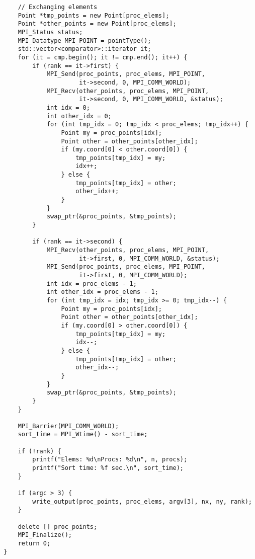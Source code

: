 \documentclass[oneside,final,14pt]{extreport}
\begin{document}
\begin{verbatim}
    // Exchanging elements
    Point *tmp_points = new Point[proc_elems];
    Point *other_points = new Point[proc_elems];
    MPI_Status status;
    MPI_Datatype MPI_POINT = pointType();
    std::vector<comparator>::iterator it;
    for (it = cmp.begin(); it != cmp.end(); it++) {
        if (rank == it->first) {
            MPI_Send(proc_points, proc_elems, MPI_POINT,
                     it->second, 0, MPI_COMM_WORLD);
            MPI_Recv(other_points, proc_elems, MPI_POINT,
                     it->second, 0, MPI_COMM_WORLD, &status);
            int idx = 0;
            int other_idx = 0;
            for (int tmp_idx = 0; tmp_idx < proc_elems; tmp_idx++) {
                Point my = proc_points[idx];
                Point other = other_points[other_idx];
                if (my.coord[0] < other.coord[0]) {
                    tmp_points[tmp_idx] = my;
                    idx++;
                } else {
                    tmp_points[tmp_idx] = other;
                    other_idx++;
                }
            }
            swap_ptr(&proc_points, &tmp_points);
        }

        if (rank == it->second) {
            MPI_Recv(other_points, proc_elems, MPI_POINT,
                     it->first, 0, MPI_COMM_WORLD, &status);
            MPI_Send(proc_points, proc_elems, MPI_POINT,
                     it->first, 0, MPI_COMM_WORLD);
            int idx = proc_elems - 1;
            int other_idx = proc_elems - 1;
            for (int tmp_idx = idx; tmp_idx >= 0; tmp_idx--) {
                Point my = proc_points[idx];
                Point other = other_points[other_idx];
                if (my.coord[0] > other.coord[0]) {
                    tmp_points[tmp_idx] = my;
                    idx--;
                } else {
                    tmp_points[tmp_idx] = other;
                    other_idx--;
                }
            }
            swap_ptr(&proc_points, &tmp_points);
        }
    }

    MPI_Barrier(MPI_COMM_WORLD);
    sort_time = MPI_Wtime() - sort_time;

    if (!rank) {
        printf("Elems: %d\nProcs: %d\n", n, procs);
        printf("Sort time: %f sec.\n", sort_time);
    }

    if (argc > 3) {
        write_output(proc_points, proc_elems, argv[3], nx, ny, rank);
    }

    delete [] proc_points;
    MPI_Finalize();
    return 0;
}

\end{verbatim}
\end{document}
